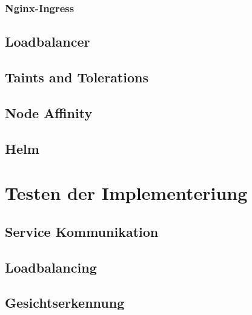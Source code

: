 \subsubsection{Nginx-Ingress}
\subsection{Loadbalancer}
\subsection{Taints and Tolerations}
\subsection{Node Affinity}
\subsection{Helm}


\section{Testen der Implementeriung}
\subsection{Service Kommunikation}
\subsection{Loadbalancing}
\subsection{Gesichtserkennung}